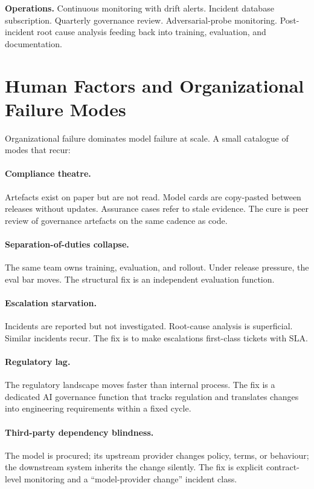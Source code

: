 \textbf{Operations.}
Continuous monitoring with drift alerts. Incident database
subscription. Quarterly governance review. Adversarial-probe
monitoring. Post-incident root cause analysis feeding back into
training, evaluation, and documentation.

\section{Human Factors and Organizational Failure Modes}

Organizational failure dominates model failure at scale. A small
catalogue of modes that recur:

\paragraph{Compliance theatre.} Artefacts exist on paper but are
not read. Model cards are copy-pasted between releases without
updates. Assurance cases refer to stale evidence. The cure is
peer review of governance artefacts on the same cadence as
code.

\paragraph{Separation-of-duties collapse.} The same team owns
training, evaluation, and rollout. Under release pressure, the
eval bar moves. The structural fix is an independent evaluation
function.

\paragraph{Escalation starvation.} Incidents are reported but
not investigated. Root-cause analysis is superficial. Similar
incidents recur. The fix is to make escalations first-class
tickets with SLA.

\paragraph{Regulatory lag.} The regulatory landscape moves
faster than internal process. The fix is a dedicated AI
governance function that tracks regulation and translates
changes into engineering requirements within a fixed cycle.

\paragraph{Third-party dependency blindness.} The model is
procured; its upstream provider changes policy, terms, or
behaviour; the downstream system inherits the change silently.
The fix is explicit contract-level monitoring and a
``model-provider change'' incident class.

